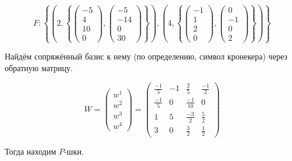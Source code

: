 \documentclass[12pt, a4paper]{article}
\begin{document}
    \begin{equation}
        F: \left\{ 
            \left(2, \left\{\begin{pmatrix} -5\\4\\10\\0 \end{pmatrix}, \begin{pmatrix} -5\\-14\\0\\30 \end{pmatrix} \right\} \right),
            \left(4, \left\{\begin{pmatrix} -1\\1\\2\\0 \end{pmatrix}, \begin{pmatrix} 0\\-1\\0\\2 \end{pmatrix} \right\} \right)
        \right\}
    \end{equation}
    

    Найдём сопряжённый базис к нему (по определению, символ кронекера) через обратную матрицу.

    \begin{equation}
        W = \begin{pmatrix}
            w^1 \\ w^2 \\ w^3 \\ w^4
        \end{pmatrix} = \left(\begin{matrix}
            \frac{-1}{5} & -1 & \frac{2}{5} & \frac{-1}{2} \\
            \frac{-1}{5} & 0 & \frac{-1}{10} & 0 \\
            1 & 5 & \frac{-3}{2} & \frac{5}{2} \\
            3 & 0 & \frac{3}{2} & \frac{1}{2}
        \end{matrix}\right)
    \end{equation}

    Тогда находим $P$-шки.
\end{document}
